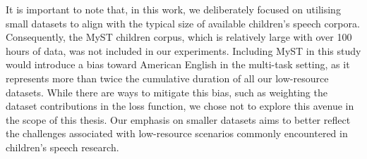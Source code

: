 It is important to note that, in this work, we deliberately focused on utilising small datasets to align with the typical size of available children's speech corpora. Consequently, the MyST children corpus, which is relatively large with over 100 hours of data, was not included in our experiments. Including MyST in this study would introduce a bias toward American English in the multi-task setting, as it represents more than twice the cumulative duration of all our low-resource datasets. While there are ways to mitigate this bias, such as weighting the dataset contributions in the loss function, we chose not to explore this avenue in the scope of this thesis. Our emphasis on smaller datasets aims to better reflect the challenges associated with low-resource scenarios commonly encountered in children's speech research.




